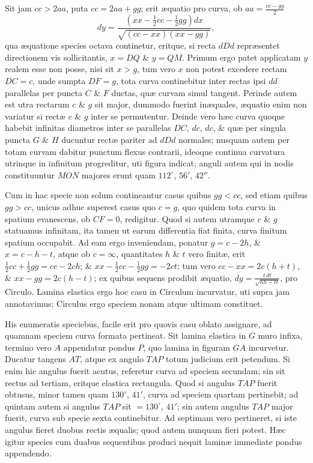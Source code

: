 Sit jam $cc>2aa$, puta $cc=2aa+gg$; erit æquatio pro curva, ob $aa=\frac{cc-gg}2$
\[dy=\frac{(xx-\frac12cc-\frac12gg)dx}{\sqrt{(cc-xx)(xx-gg)}},\]
qua æquatione species octava continetur, eritque, si recta $dDd$ repræsentet directionem vis sollicitantis, $x=DQ$ \& $y=QM$. Primum ergo patet applicatam $y$ realem esse non posse, nisi sit $x>g$, tum vero $x$ non potest excedere rectam $DC=c$, unde sumpta $DF=g$, tota curva continebitur inter rectas ipsi $dd$ parallelas per puncta $C$ \& $F$ ductas, quæ curvam simul tangent. Perinde autem est utra rectarum $c$ \& $g$ sit major, dummodo fuerint inæquales, æquatio enim non variatur si rectæ $c$ \& $g$ inter se permutentur. Deinde vero hæc curva quoque habebit infinitas diametros inter se parallelas $DC$, $dc$, $dc$, \& quæ per singula puncta $G$ \& $H$ ducuntur rectæ pariter ad $dDd$ normales; nusquam autem per totam curvam dabitur punctum flexus contrarii, ideoque continua curvatura utrinque in infinitum progreditur, uti figura indicat; anguli autem qui in nodis constituuntur $MON$ majores erunt quam $112^\circ$, $56'$, $42''$.

Cum in hac specie non solum contineantur casus quibus $gg<cc$, sed etiam quibus $gg>cc$, unicus adhuc superest casus quo $c=g$, quo quidem tota curva in spatium evanescens, ob $CF=0$, redigitur. Quod si autem utramque $c$ \& $g$ statuamus infinitam, ita tamen ut earum differentia fiat finita, curva finitum spatium occupabit. Ad eam ergo inveniendam, ponatur $g=c-2h$, \& $x=c-h-t$, atque ob $c=\infty$, quantitates $h$ \& $t$ vero finitæ, erit $\frac12cc+\frac12gg=cc-2ch$; \& $xx-\frac12cc-\frac12gg=-2ct$; tum vero $cc-xx=2c(h+t)$, \& $xx-gg=2c(h-t)$; ex quibus sequens prodibit æquatio, $dy=\frac{t\,dt}{\sqrt{hh-tt}}$, pro Circulo. Lamina elastica ergo hoc casu in Circulum incurvatur, uti supra jam annotavimus; Circulus ergo speciem nonam atque ultimam constituet.

His enumeratis speciebus, facile erit pro quovis casu oblato assignare, ad quamnam speciem curva formata pertineat. Sit lamina elastica in $G$ muro infixa, termino vero $A$ appendatur pondus $P$, quo lamina in figuram $GA$ incurvetur. Ducatur tangens $AT$, atque ex angulo $TAP$ totum judicium erit petendum. Si enim hic angulus fuerit acutus, referetur curva ad speciem secundam; sin sit rectus ad tertiam, eritque elastica rectangula. Quod si angulus $TAP$ fuerit obtusus, minor tamen quam $130^\circ$, $41'$, curva ad speciem quartam pertinebit; ad quintam autem si angulus $TAP$ sit $=130^\circ$, $41'$; sin autem angulus $TAP$ major fuerit, curva sub specie sexta continebitur. Ad septimam vero pertineret, si iste angulus fieret duobus rectis æqualis; quod autem nunquam fieri potest. Hæc igitur species cum duabus sequentibus produci nequit laminæ immediate pondus appendendo.

